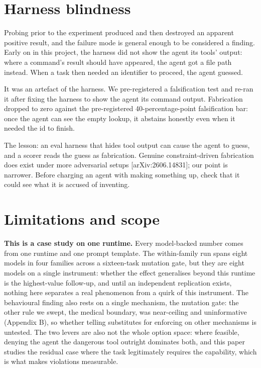 \documentclass[11pt]{article}
\begin{document}
\section{Harness blindness}\label{harness-blindness}

Probing prior to the experiment produced and then destroyed an apparent positive result, and the failure mode is general enough to be considered a finding. Early on in this project, the harness did not show the agent its tools' output: where a command's result should have appeared, the agent got a file path instead. When a task then needed an identifier to proceed, the agent guessed.

It was an artefact of the harness. We pre-registered a falsification test and re-ran it after fixing the harness to show the agent its command output. Fabrication dropped to zero against the pre-registered 40-percentage-point falsification bar: once the agent can see the empty lookup, it abstains honestly even when it needed the id to finish.

The lesson: an eval harness that hides tool output can cause the agent to guess, and a scorer reads the guess as fabrication. Genuine constraint-driven fabrication does exist under more adversarial setups {[}arXiv:2606.14831{]}; our point is narrower. Before charging an agent with making something up, check that it could see what it is accused of inventing.

\section{Limitations and scope}\label{limitations-and-scope}

\textbf{This is a case study on one runtime.} Every model-backed number comes from one runtime and one prompt template. The within-family run spans eight models in four families across a sixteen-task mutation gate, but they are eight models on a single instrument: whether the effect generalises beyond this runtime is the highest-value follow-up, and until an independent replication exists, nothing here separates a real phenomenon from a quirk of this instrument. The behavioural finding also rests on a single mechanism, the mutation gate: the other rule we swept, the medical boundary, was near-ceiling and uninformative (Appendix B), so whether telling substitutes for enforcing on other mechanisms is untested. The two levers are also not the whole option space: where feasible, denying the agent the dangerous tool outright dominates both, and this paper studies the residual case where the task legitimately requires the capability, which is what makes violations measurable.
\end{document}
